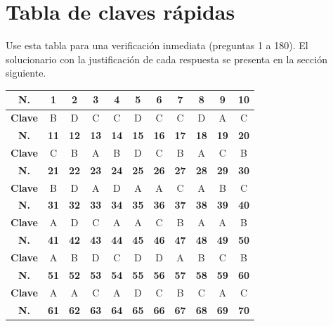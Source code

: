 \newpage
\section*{Tabla de claves rápidas}

\noindent Use esta tabla para una verificación inmediata (preguntas 1 a 180). El solucionario con la justificación de cada respuesta se presenta en la sección siguiente.

\vspace{0.35cm}
\begin{center}
\footnotesize
\renewcommand{\arraystretch}{1.25}
\begin{tabular}{|c|c|c|c|c|c|c|c|c|c|c|}
\hline
\textbf{N.} & \textbf{1} & \textbf{2} & \textbf{3} & \textbf{4} & \textbf{5} & \textbf{6} & \textbf{7} & \textbf{8} & \textbf{9} & \textbf{10} \\
\hline
\textbf{Clave} & B & D & C & C & D & C & C & D & A & C \\
\hline
\textbf{N.} & \textbf{11} & \textbf{12} & \textbf{13} & \textbf{14} & \textbf{15} & \textbf{16} & \textbf{17} & \textbf{18} & \textbf{19} & \textbf{20} \\
\hline
\textbf{Clave} & C & B & A & B & D & C & B & A & C & B \\
\hline
\textbf{N.} & \textbf{21} & \textbf{22} & \textbf{23} & \textbf{24} & \textbf{25} & \textbf{26} & \textbf{27} & \textbf{28} & \textbf{29} & \textbf{30} \\
\hline
\textbf{Clave} & B & D & A & D & A & A & C & A & B & C \\
\hline
\textbf{N.} & \textbf{31} & \textbf{32} & \textbf{33} & \textbf{34} & \textbf{35} & \textbf{36} & \textbf{37} & \textbf{38} & \textbf{39} & \textbf{40} \\
\hline
\textbf{Clave} & A & D & C & A & A & C & B & A & A & B \\
\hline
\textbf{N.} & \textbf{41} & \textbf{42} & \textbf{43} & \textbf{44} & \textbf{45} & \textbf{46} & \textbf{47} & \textbf{48} & \textbf{49} & \textbf{50} \\
\hline
\textbf{Clave} & A & B & D & C & D & D & A & B & C & B \\
\hline
\textbf{N.} & \textbf{51} & \textbf{52} & \textbf{53} & \textbf{54} & \textbf{55} & \textbf{56} & \textbf{57} & \textbf{58} & \textbf{59} & \textbf{60} \\
\hline
\textbf{Clave} & A & A & C & A & D & C & B & C & A & C \\
\hline
\textbf{N.} & \textbf{61} & \textbf{62} & \textbf{63} & \textbf{64} & \textbf{65} & \textbf{66} & \textbf{67} & \textbf{68} & \textbf{69} & \textbf{70} \\

\end{tabular}
\end{center}
